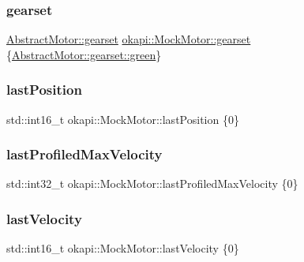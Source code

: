 \subsubsection{\texorpdfstring{gearset}{gearset}}
{\footnotesize\ttfamily \mbox{\hyperlink{classokapi_1_1AbstractMotor_a88aaa6ea2fa10f5520a537bbf26774d5}{Abstract\+Motor\+::gearset}} \mbox{\hyperlink{classokapi_1_1AbstractMotor_a88aaa6ea2fa10f5520a537bbf26774d5}{okapi\+::\+Mock\+Motor\+::gearset}} \{\mbox{\hyperlink{classokapi_1_1AbstractMotor_a88aaa6ea2fa10f5520a537bbf26774d5a9f27410725ab8cc8854a2769c7a516b8}{Abstract\+Motor\+::gearset\+::green}}\}}

\mbox{\label{classokapi_1_1MockMotor_a13fbd1a947731e558126b3d7bda7e299}} 
\subsubsection{\texorpdfstring{lastPosition}{lastPosition}}
{\footnotesize\ttfamily std\+::int16\+\_\+t okapi\+::\+Mock\+Motor\+::last\+Position \{0\}\hspace{0.3cm}{\ttfamily [mutable]}}

\mbox{\label{classokapi_1_1MockMotor_a6eafd5c0423b3e6db96385819204f6af}} 
\subsubsection{\texorpdfstring{lastProfiledMaxVelocity}{lastProfiledMaxVelocity}}
{\footnotesize\ttfamily std\+::int32\+\_\+t okapi\+::\+Mock\+Motor\+::last\+Profiled\+Max\+Velocity \{0\}\hspace{0.3cm}{\ttfamily [mutable]}}

\mbox{\label{classokapi_1_1MockMotor_a9d36a5a5c27a44ee933665124340b9d5}} 
\subsubsection{\texorpdfstring{lastVelocity}{lastVelocity}}
{\footnotesize\ttfamily std\+::int16\+\_\+t okapi\+::\+Mock\+Motor\+::last\+Velocity \{0\}\hspace{0.3cm}{\ttfamily [mutable]}}

